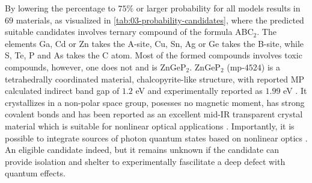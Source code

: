 By lowering the percentage to $75\%$ or larger probability for all models results in $69$ materials, as visualized in \autoref{tab:03-probability-candidates}, where the predicted suitable candidates involves ternary compound of the formula ABC$_2$. The elements Ga, Cd or Zn takes the A-site, Cu, Sn, Ag or Ge takes the B-site, while S, Te, P and As takes the C atom. Most of the formed compounds involves toxic compounds, however, one does not and is ZnGeP$_2$. ZnGeP$_2$ (mp-$4524$) is a tetrahedrally coordinated material, chalcopyrite-like structure, with reported MP calculated indirect band gap of $1.2$ eV \cite{Zhang2015} and experimentally reported as $1.99$ eV \cite{Xing1989}.
It crystallizes in a non-polar space group, posesses no magnetic moment, has strong covalent bonds and has been reported as an excellent mid-IR transparent crystal material which is suitable for nonlinear optical applications \cite{Zhang2015}. Importantly, it is possible to integrate sources of photon quantum states based on nonlinear optics \cite{Caspani2017}. An eligible candidate indeed, but it remains unknown if the candidate can provide isolation and shelter to experimentally fascilitate a deep defect with quantum effects.






